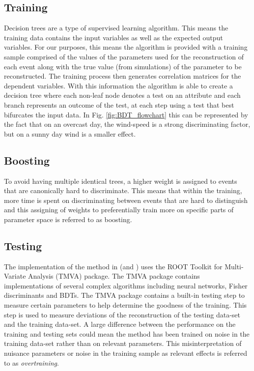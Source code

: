 \documentclass[main.tex]{subfiles}
\begin{document}
\subsection{Training}
Decision trees are a type of supervised learning algorithm. This means the training data contains the input variables as well as the expected output variables. For our purposes, this means the algorithm is provided with a training sample comprised of the values of the parameters used for the reconstruction of each event along with the true value (from simulations) of the parameter to be reconstructed. The training process then generates correlation matrices for the dependent variables. With this information the algorithm is able to create a decision tree where each non-leaf node denotes a test on an attribute and each branch represents an outcome of the test, at each step using a test that best bifurcates the input data. In Fig. \ref{fig:BDT_flowchart} this can be represented by the fact that on an overcast day, the wind-speed is a strong discriminating factor, but on a sunny day wind is a smaller effect.

\subsection{Boosting}
To avoid having multiple identical trees, a higher weight is assigned to events that are canonically hard to discriminate. This means that within the training, more time is spent on discriminating between events that are hard to distinguish and this assigning of weights to preferentially train more on specific parts of parameter space is referred to as boosting.

\subsection{Testing}
The implementation of the \disp method in \vegas (and \ed) uses the ROOT Toolkit for Multi-Variate Analysis (TMVA) package. The TMVA package contains implementations of several complex algorithms including neural networks, Fisher discriminants and BDTs. The TMVA package contains a built-in testing step to measure certain parameters to help determine the goodness of the training. This step is used to measure deviations of the reconstruction of the testing data-set and the training data-set. A large difference between the performance on the training and testing sets could mean the method has been trained on noise in the training data-set rather than on relevant parameters. This misinterpretation of nuisance parameters or noise in the training sample as relevant effects is referred to as \textit{overtraining}.
\end{document}
